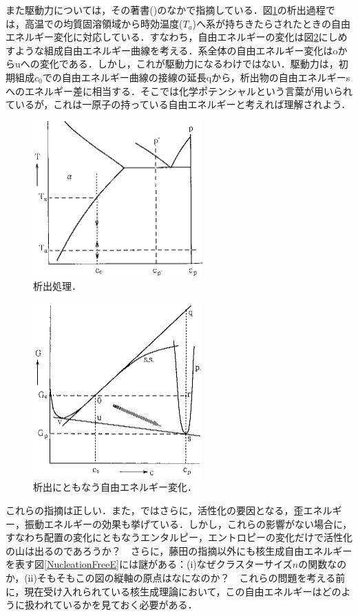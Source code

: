 \documentclass[a4j,10pt]{jarticle}
\begin{document}
また駆動力については，その著書(\cite{Fujita:1996})のなかで指摘している．図\ref{Precipitation}の析出過程では，高温での均質固溶領域から時効温度($T_a$)へ系が持ちきたらされたときの自由エネルギー変化に対応している．すなわち，自由エネルギーの変化は図\ref{DrivingForce}にしめすような組成自由エネルギー曲線を考える．系全体の自由エネルギー変化はoからuへの変化である．しかし，これが駆動力になるわけではない．駆動力は，初期組成$c_0$での自由エネルギー曲線の接線の延長qから，析出物の自由エネルギーsへのエネルギー差に相当する．そこでは化学ポテンシャルという言葉が用いられているが，これは一原子の持っている自由エネルギーと考えれば理解されよう．
\begin{figure}[ht]\begin{center}
\includegraphics[width=65mm]{./figs/Precipitation.eps}
\caption{析出処理．}
\label{Precipitation}
\end{center}\end{figure}
\begin{figure}[ht]\begin{center}
\includegraphics[width=65mm]{./figs/DrivingForce.eps}
\caption{析出にともなう自由エネルギー変化．}
\label{DrivingForce}
\end{center}\end{figure}

これらの指摘は正しい．また，\cite{Fujita:2003}ではさらに，活性化の要因となる，歪エネルギー，振動エネルギーの効果も挙げている．しかし，これらの影響がない場合に，すなわち配置の変化にともなうエンタルピー，エントロピーの変化だけで活性化の山は出るのであろうか？　さらに，藤田の指摘以外にも核生成自由エネルギーを表す図\ref{NucleationFreeE}には謎がある：(i)なぜクラスターサイズ$n$の関数なのか，(ii)そもそもこの図の縦軸の原点はなになのか？　これらの問題を考える前に，現在受け入れられている核生成理論において，この自由エネルギーはどのように扱われているかを見ておく必要がある．
\end{document}

